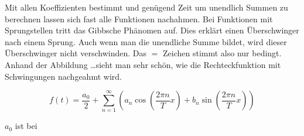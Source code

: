 Mit allen Koeffizienten bestimmt und genügend Zeit um unendlich Summen zu berechnen lassen sich fast alle Funktionen nachahmen.
Bei Funktionen mit Sprungstellen tritt das Gibbsche Phänomen auf.
Dies erklärt einen Überschwinger nach einem Sprung. Auch wenn man die unendliche Summe bildet, wird dieser Überschwinger nicht verschwinden.
Das $=$ Zeichen stimmt also nur bedingt.
Anhand der Abbildung \dots sieht man sehr schön, wie die Rechteckfunktion mit Schwingungen nachgeahmt wird. %

\[
f(t) = \frac{a_0}{2} + \sum_{n=1}^{\infty} \left( a_n \cos\left( \frac{2\pi n}{T} x \right) + b_n \sin\left( \frac{2\pi n}{T} x \right) \right)
\]


$a_0$ ist bei 




